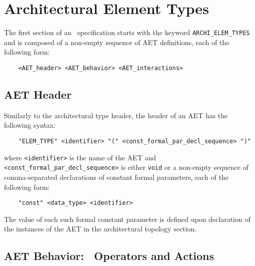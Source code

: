 \section{Architectural Element Types}

The first section of an \aemilia\ specification starts with the keyword {\tt ARCHI\_ELEM\_TYPES} and is
composed of a non-empty sequence of AET definitions, each of the following form:

	\begin{verbatim}
    <AET_header> <AET_behavior> <AET_interactions>
	\end{verbatim}


\subsection{AET Header}

Similarly to the architectural type header, the header of an AET has the following syntax:

	\begin{verbatim}
    "ELEM_TYPE" <identifier> "(" <const_formal_par_decl_sequence> ")"
	\end{verbatim}

\noindent where {\tt <identifier>} is the name of the AET and {\tt <const\_formal\_par\_decl\_sequence>} is
either {\tt void} or a non-empty sequence of comma-separated declarations of constant formal parameters,
each of the following form:

	\begin{verbatim}
    "const" <data_type> <identifier>
	\end{verbatim}

\noindent The value of each such formal constant parameter is defined upon declaration of the instances of
the AET in the architectural topology section.


\subsection{AET Behavior: \empagr\ Operators and Actions}\label{aet_behavior}

